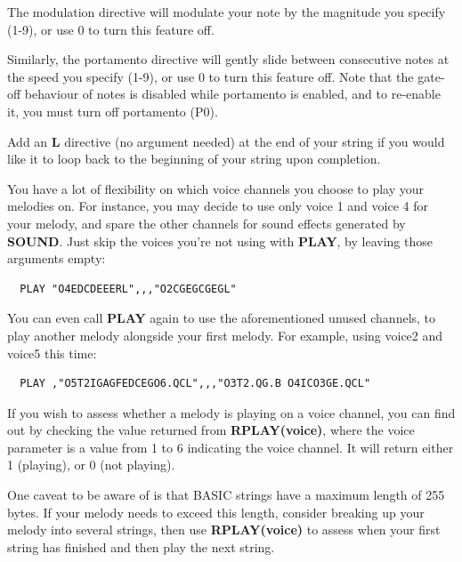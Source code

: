 \begin{description}[leftmargin=2cm,style=nextline]
  The modulation directive will modulate your note by the magnitude you specify (1-9), or use 0 to turn this feature off.

    Similarly, the portamento directive will gently slide between consecutive notes at the speed you specify (1-9), or use 0 to turn this feature off. Note that the gate-off behaviour of notes is disabled while portamento is enabled, and to re-enable it, you must turn off portamento (P0).

    Add an {\bf L} directive (no argument needed) at the end of your string if you would like it to loop back to the
  beginning of your string upon completion.

  You have a lot of flexibility on which voice channels you choose to play your melodies on.
  For instance, you may decide to use only voice 1 and voice 4 for your melody, and spare
  the other channels for sound effects generated by {\bf SOUND}. Just skip the voices
  you're not using with {\bf PLAY}, by leaving those arguments empty:

\begin{tcolorbox}[colback=black,coltext=white]
\verbatimfont{\codefont}
\begin{verbatim}
  PLAY "O4EDCDEEERL",,,"O2CGEGCGEGL"
\end{verbatim}
\end{tcolorbox}

  You can even call {\bf PLAY} again to use the aforementioned unused channels, to play another melody
  alongside your first melody. For example, using voice2 and voice5 this time:

\begin{tcolorbox}[colback=black,coltext=white]
\verbatimfont{\codefont}
\begin{verbatim}
  PLAY ,"O5T2IGAGFEDCEGO6.QCL",,,"O3T2.QG.B O4ICO3GE.QCL"
\end{verbatim}
\end{tcolorbox}

  If you wish to assess whether a melody is playing on a voice channel, you can
  find out by checking the value returned from {\bf RPLAY(voice)}, where the voice parameter
  is a value from 1 to 6 indicating the voice channel. It will return either 1 (playing),
  or 0 (not playing).

  One caveat to be aware of is that BASIC strings have a maximum length of 255 bytes.
  If your melody needs to exceed this length, consider breaking up your melody into several
  strings, then use {\bf RPLAY(voice)} to assess when your first string has finished and then
  play the next string.


\end{description}
